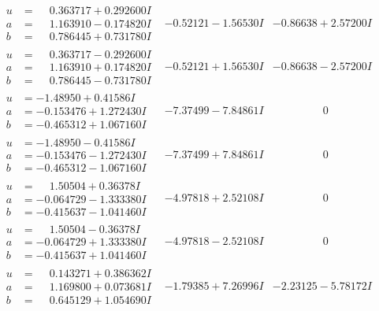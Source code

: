 \documentclass[1p]{elsarticle_modified}
\theoremstyle{definition}
\begin{document}
$$\begin{array}{c|c|c}
\begin{aligned}
u &= \phantom{-}0.363717 + 0.292600 I \\
a &= \phantom{-}1.163910 - 0.174820 I \\
b &= \phantom{-}0.786445 + 0.731780 I\end{aligned}
 & -0.52121 - 1.56530 I & -0.86638 + 2.57200 I \\ \hline\begin{aligned}
u &= \phantom{-}0.363717 - 0.292600 I \\
a &= \phantom{-}1.163910 + 0.174820 I \\
b &= \phantom{-}0.786445 - 0.731780 I\end{aligned}
 & -0.52121 + 1.56530 I & -0.86638 - 2.57200 I \\ \hline\begin{aligned}
u &= -1.48950 + 0.41586 I \\
a &= -0.153476 + 1.272430 I \\
b &= -0.465312 + 1.067160 I\end{aligned}
 & -7.37499 - 7.84861 I & \phantom{-0.000000 } 0 \\ \hline\begin{aligned}
u &= -1.48950 - 0.41586 I \\
a &= -0.153476 - 1.272430 I \\
b &= -0.465312 - 1.067160 I\end{aligned}
 & -7.37499 + 7.84861 I & \phantom{-0.000000 } 0 \\ \hline\begin{aligned}
u &= \phantom{-}1.50504 + 0.36378 I \\
a &= -0.064729 - 1.333380 I \\
b &= -0.415637 - 1.041460 I\end{aligned}
 & -4.97818 + 2.52108 I & \phantom{-0.000000 } 0 \\ \hline\begin{aligned}
u &= \phantom{-}1.50504 - 0.36378 I \\
a &= -0.064729 + 1.333380 I \\
b &= -0.415637 + 1.041460 I\end{aligned}
 & -4.97818 - 2.52108 I & \phantom{-0.000000 } 0 \\ \hline\begin{aligned}
u &= \phantom{-}0.143271 + 0.386362 I \\
a &= \phantom{-}1.169800 + 0.073681 I \\
b &= \phantom{-}0.645129 + 1.054690 I\end{aligned}
 & -1.79385 + 7.26996 I & -2.23125 - 5.78172 I\\

\end{array}$$
\end{document}
